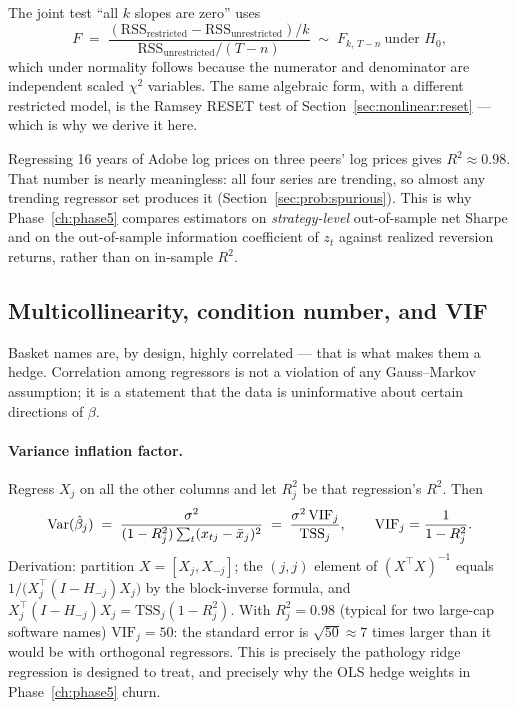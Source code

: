 The joint test ``all $k$ slopes are zero'' uses
\begin{equation}
  F \;=\; \frac{(\mathrm{RSS}_{\text{restricted}}-\mathrm{RSS}_{\text{unrestricted}})/k}
              {\mathrm{RSS}_{\text{unrestricted}}/(T-n)}
  \;\sim\; F_{k,\,T-n}\ \text{under }H_0 ,
  \label{eq:ftest}
\end{equation}
which under normality follows because the numerator and denominator are independent
scaled $\chi^2$ variables. The same algebraic form, with a different restricted model,
is the Ramsey RESET test of Section~\ref{sec:nonlinear:reset} --- which is why we derive
it here.

\begin{remark}
Regressing 16 years of Adobe log prices on three peers' log prices gives
$R^2\approx0.98$. That number is nearly meaningless: all four series are trending,
so almost any trending regressor set produces it (Section~\ref{sec:prob:spurious}).
This is why Phase~\ref{ch:phase5} compares estimators on \emph{strategy-level}
out-of-sample net Sharpe and on the out-of-sample information coefficient of $z_t$
against realized reversion returns, rather than on in-sample $R^2$.
\end{remark}

\subsection{Multicollinearity, condition number, and VIF}
\label{sec:ols:multicol}

Basket names are, by design, highly correlated --- that is what makes them a hedge.
Correlation among regressors is not a violation of any Gauss--Markov assumption; it is a
statement that the data is uninformative about certain directions of $\beta$.

\paragraph{Variance inflation factor.} Regress $X_j$ on all the other columns and let
$R^2_j$ be that regression's $R^2$. Then
\begin{equation}
  \operatorname{Var}(\hat\beta_j) \;=\; \frac{\sigma^{2}}{(1-R^2_j)\sum_t (x_{tj}-\bar x_j)^2}
  \;=\; \frac{\sigma^{2}\,\mathrm{VIF}_j}{\mathrm{TSS}_j},
  \qquad \mathrm{VIF}_j = \frac{1}{1-R^2_j}.
  \label{eq:vif}
\end{equation}
Derivation: partition $X=[X_j, X_{-j}]$; the $(j,j)$ element of $(X^{\top}X)^{-1}$ equals
$1/\bigl(X_j^{\top}(I-H_{-j})X_j\bigr)$ by the block-inverse formula, and
$X_j^{\top}(I-H_{-j})X_j = \mathrm{TSS}_j(1-R^2_j)$. With $R^2_j=0.98$ (typical for two
large-cap software names) $\mathrm{VIF}_j=50$: the standard error is $\sqrt{50}\approx7$
times larger than it would be with orthogonal regressors. This is precisely the pathology
ridge regression is designed to treat, and precisely why the OLS hedge weights in
Phase~\ref{ch:phase5} churn.

